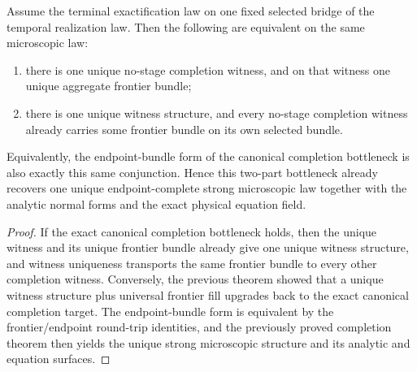 \begin{theorem}
\label{thm:canonical-completion-frontier-bundle-target-iff-canonical-flagship-witness-plus-universal-frontier-fill}
Assume the terminal exactification law on one fixed selected bridge of the
temporal realization law. Then the following are equivalent on the same
microscopic law:
\begin{enumerate}
\item there is one unique no-stage completion witness, and on that witness one
unique aggregate frontier bundle;
\item there is one unique witness structure, and every
      no-stage completion witness already carries some frontier bundle on
      its own selected bundle.
\end{enumerate}
Equivalently, the endpoint-bundle form of the canonical completion bottleneck
is also exactly this same conjunction. Hence this two-part bottleneck already
recovers one unique endpoint-complete strong microscopic law together with the
analytic normal forms and the exact physical equation field.
\end{theorem}

\begin{proof}
If the exact canonical completion bottleneck holds, then the unique witness and
its unique frontier bundle already give one unique witness structure,
and witness uniqueness transports the same frontier bundle to every other
completion witness. Conversely, the previous theorem showed that a unique
witness structure plus universal frontier fill upgrades back to the
exact canonical completion target. The endpoint-bundle form is equivalent by
the frontier/endpoint round-trip identities, and the previously proved
completion theorem then yields the unique strong microscopic structure
and its analytic and equation surfaces.
\end{proof}

